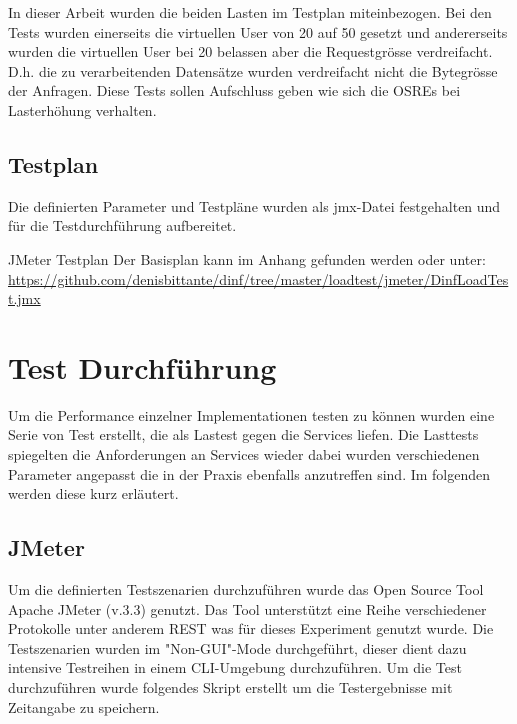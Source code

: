 \documentclass[main.tex]{subfiles}
\begin{document}
In dieser Arbeit wurden die beiden Lasten im Testplan miteinbezogen. Bei den Tests wurden einerseits die virtuellen User von 20 auf 50 gesetzt und andererseits wurden die virtuellen User bei 20 belassen aber die Requestgrösse verdreifacht. D.h. die zu verarbeitenden Datensätze wurden verdreifacht nicht die Bytegrösse der Anfragen.
Diese Tests sollen Aufschluss geben wie sich die OSREs bei Lasterhöhung verhalten.

\subsection{Testplan}

Die definierten Parameter und Testpläne wurden als jmx-Datei festgehalten und für die Testdurchführung aufbereitet. 


\begin{reference}{JMeter Testplan}
Der Basisplan kann im Anhang gefunden werden oder unter: 
 \url{https://github.com/denisbittante/dinf/tree/master/loadtest/jmeter/DinfLoadTest.jmx}
 
\end{reference}



\section{Test Durchführung}


Um die Performance einzelner Implementationen testen zu können wurden eine Serie von Test erstellt, die als Lastest gegen die Services liefen. Die Lasttests spiegelten die Anforderungen an Services wieder dabei wurden verschiedenen Parameter angepasst die in der Praxis ebenfalls anzutreffen sind. Im folgenden werden diese kurz erläutert.

\subsection{JMeter}


Um die definierten Testszenarien durchzuführen wurde  das Open Source Tool Apache JMeter (v.3.3) genutzt. Das Tool unterstützt eine Reihe verschiedener Protokolle unter anderem REST was für dieses Experiment genutzt wurde. Die Testszenarien wurden im  "Non-GUI"-Mode durchgeführt, dieser dient dazu intensive Testreihen in einem CLI-Umgebung durchzuführen.
Um die Test durchzuführen wurde  folgendes Skript erstellt um die Testergebnisse mit Zeitangabe zu speichern.
\end{document}
